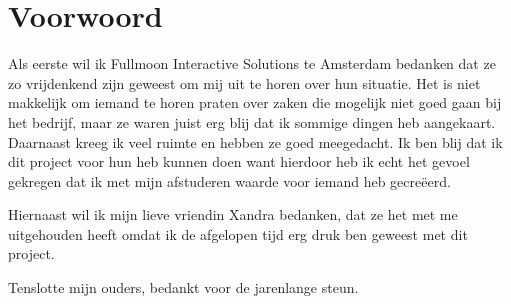 \chapter*{Voorwoord} 

Als eerste wil ik Fullmoon Interactive Solutions te Amsterdam bedanken dat ze zo vrijdenkend zijn geweest om mij uit te horen over hun situatie. Het is niet makkelijk om iemand te horen praten over zaken die mogelijk niet goed gaan bij het bedrijf, maar ze waren juist erg blij dat ik sommige dingen heb aangekaart. Daarnaast kreeg ik veel ruimte en hebben ze goed meegedacht. Ik ben blij dat ik dit project voor hun heb kunnen doen want hierdoor heb ik echt het gevoel gekregen dat ik met mijn afstuderen waarde voor iemand heb gecreëerd.

Hiernaast wil ik mijn lieve vriendin Xandra bedanken, dat ze het met me uitgehouden heeft omdat ik de afgelopen tijd erg druk ben geweest met dit project.

Tenslotte mijn ouders, bedankt voor de jarenlange steun.
